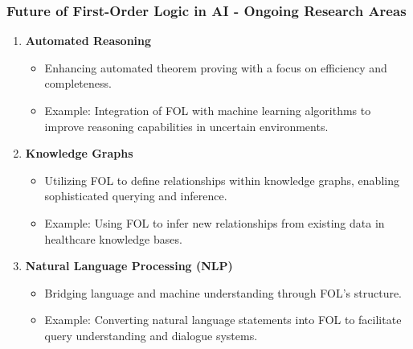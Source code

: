 \documentclass[aspectratio=169]{beamer}
\begin{document}
\begin{frame}[fragile]
    \frametitle{Future of First-Order Logic in AI - Ongoing Research Areas}
    \begin{enumerate}
        \item \textbf{Automated Reasoning}
            \begin{itemize}
                \item Enhancing automated theorem proving with a focus on efficiency and completeness.
                \item Example: Integration of FOL with machine learning algorithms to improve reasoning capabilities in uncertain environments.
            \end{itemize}
        \item \textbf{Knowledge Graphs}
            \begin{itemize}
                \item Utilizing FOL to define relationships within knowledge graphs, enabling sophisticated querying and inference.
                \item Example: Using FOL to infer new relationships from existing data in healthcare knowledge bases.
            \end{itemize}
        \item \textbf{Natural Language Processing (NLP)}
            \begin{itemize}
                \item Bridging language and machine understanding through FOL’s structure.
                \item Example: Converting natural language statements into FOL to facilitate query understanding and dialogue systems.
            \end{itemize}
    \end{enumerate}
\end{frame}
\end{document}
